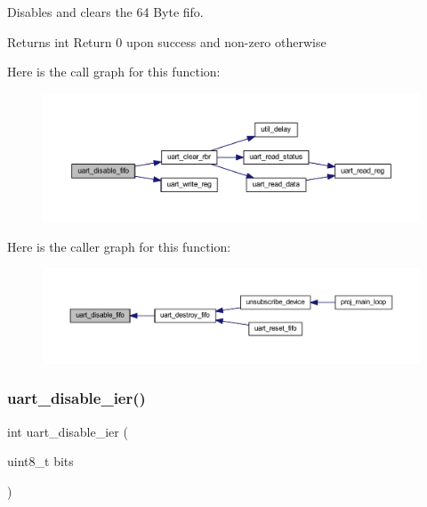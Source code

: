 Disables and clears the 64 Byte fifo. 

\begin{DoxyReturn}{Returns}
int Return 0 upon success and non-\/zero otherwise 
\end{DoxyReturn}
Here is the call graph for this function\+:\nopagebreak
\begin{figure}[H]
\begin{center}
\leavevmode
\includegraphics[width=350pt]{group__uart_gaab82e10e73e8b9986637482bc794f33e_cgraph}
\end{center}
\end{figure}
Here is the caller graph for this function\+:\nopagebreak
\begin{figure}[H]
\begin{center}
\leavevmode
\includegraphics[width=350pt]{group__uart_gaab82e10e73e8b9986637482bc794f33e_icgraph}
\end{center}
\end{figure}
\mbox{\label{group__uart_gaf05ac9402cb47de033844fb3f86beb31}} 
\subsubsection{\texorpdfstring{uart\+\_\+disable\+\_\+ier()}{uart\_disable\_ier()}}
{\footnotesize\ttfamily int uart\+\_\+disable\+\_\+ier (\begin{DoxyParamCaption}\item[{uint8\+\_\+t}]{bits }\end{DoxyParamCaption})}



